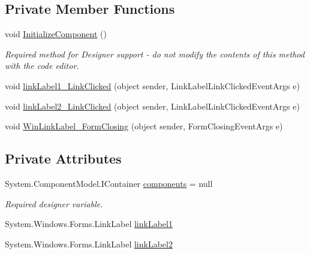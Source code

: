 \subsection*{Private Member Functions}
\begin{DoxyCompactItemize}
\item 
void \hyperlink{class__7___doroshenko__forms2__is52_1_1_win_link_label2_a8089cf25a364a03c2d9385ab3d74ec2e}{Initialize\+Component} ()
\begin{DoxyCompactList}\small\item\em Required method for Designer support -\/ do not modify the contents of this method with the code editor. \end{DoxyCompactList}\item 
void \hyperlink{class__7___doroshenko__forms2__is52_1_1_win_link_label2_a925937ae4cff4037bb5bfe92613de2f7}{link\+Label1\+\_\+\+Link\+Clicked} (object sender, Link\+Label\+Link\+Clicked\+Event\+Args e)
\item 
void \hyperlink{class__7___doroshenko__forms2__is52_1_1_win_link_label2_a678645f20d76113ee4986b67e8263edc}{link\+Label2\+\_\+\+Link\+Clicked} (object sender, Link\+Label\+Link\+Clicked\+Event\+Args e)
\item 
void \hyperlink{class__7___doroshenko__forms2__is52_1_1_win_link_label2_a5d176ff501e5fef679b23b311b91a643}{Win\+Link\+Label\+\_\+\+Form\+Closing} (object sender, Form\+Closing\+Event\+Args e)
\end{DoxyCompactItemize}
\subsection*{Private Attributes}
\begin{DoxyCompactItemize}
\item 
System.\+Component\+Model.\+I\+Container \hyperlink{class__7___doroshenko__forms2__is52_1_1_win_link_label2_a84750a0e7e0d0fa92198bbce03c8ef89}{components} = null
\begin{DoxyCompactList}\small\item\em Required designer variable. \end{DoxyCompactList}\item 
System.\+Windows.\+Forms.\+Link\+Label \hyperlink{class__7___doroshenko__forms2__is52_1_1_win_link_label2_aa532e4bf5ec7d9f8e0ea48772253504c}{link\+Label1}
\item 
System.\+Windows.\+Forms.\+Link\+Label \hyperlink{class__7___doroshenko__forms2__is52_1_1_win_link_label2_acd6c8d4173fcc3f2ea39d65f44a79135}{link\+Label2}
\end{DoxyCompactItemize}


